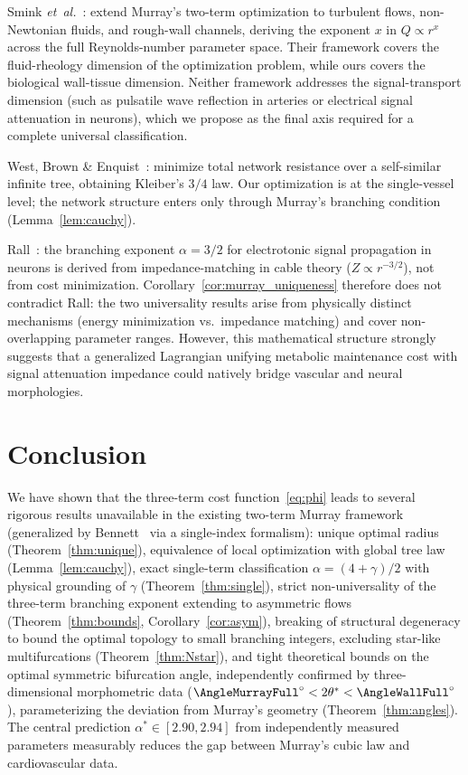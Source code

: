 \documentclass[11pt,a4paper]{article}
\theoremstyle{remark}
\begin{document}
Smink \textit{et~al.}~\cite{Smink2025}: extend Murray's two-term optimization to
turbulent flows, non-Newtonian fluids, and rough-wall channels, deriving the
exponent $x$ in $Q \propto r^x$ across the full Reynolds-number parameter space.
Their framework covers the fluid-rheology dimension of the optimization problem,
while ours covers the biological wall-tissue dimension. Neither framework
addresses the signal-transport dimension (such as pulsatile wave reflection in
arteries or electrical signal attenuation in neurons), which we propose as the
final axis required for a complete universal classification.

West, Brown \& Enquist~\cite{WBE1997}: minimize total network resistance
over a self-similar infinite tree, obtaining Kleiber's $3/4$ law.
Our optimization is at the single-vessel level; the network structure enters
only through Murray's branching condition (Lemma~\ref{lem:cauchy}).

Rall~\cite{Rall1959}: the branching exponent $\alpha=3/2$ for electrotonic
signal propagation in neurons is derived from impedance-matching in cable
theory ($Z\propto r^{-3/2}$), not from cost minimization.
Corollary~\ref{cor:murray_uniqueness} therefore does not contradict Rall: the
two
universality results arise from physically distinct mechanisms
(energy minimization vs.\ impedance matching) and cover non-overlapping
parameter ranges. However, this mathematical structure strongly suggests that a
generalized Lagrangian unifying metabolic maintenance cost with signal
attenuation impedance could natively bridge vascular and neural morphologies.

\section{Conclusion}

We have shown that the three-term cost function~\eqref{eq:phi} leads to
several rigorous results unavailable in the existing two-term Murray framework
(generalized by Bennett~\cite{bennett2025} via a single-index
formalism):
unique optimal radius (Theorem~\ref{thm:unique}),
equivalence of local optimization with global tree law (Lemma~\ref{lem:cauchy}),
exact single-term classification $\alpha=(4+\gamma)/2$ with physical grounding
of $\gamma$ (Theorem~\ref{thm:single}),
strict non-universality of the three-term branching exponent extending to
asymmetric flows
(Theorem~\ref{thm:bounds}, Corollary~\ref{cor:asym}),
breaking of structural degeneracy to bound the optimal topology to small
branching integers, excluding star-like multifurcations
(Theorem~\ref{thm:Nstar}),
and tight theoretical bounds on the optimal symmetric bifurcation angle,
independently confirmed by three-dimensional morphometric data
($\AngleMurrayFull^\circ < 2\theta^* < \AngleWallFull^\circ$), parameterizing
the deviation from Murray's geometry (Theorem~\ref{thm:angles}).
The central prediction $\alpha^*\in[2.90,2.94]$ from independently measured
parameters
measurably reduces the gap between Murray's cubic law and cardiovascular data.
\end{document}
